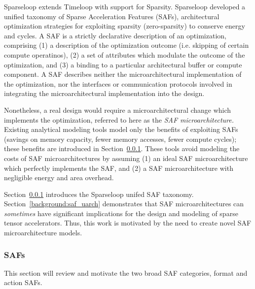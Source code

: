 Sparseloop\cite{sparseloop} extends Timeloop with support for Sparsity. Sparseloop developed a unified taxonomy of Sparse Acceleration Features (SAFs), architectural optimization strategies for exploiting sparsity (zero-sparsity) to conserve energy and cycles. A SAF is a strictly declarative description of an optimization, comprising (1) a description of the optimization outcome (i.e. skipping of certain compute operatinos), (2) a set of attributes which modulate the outcome of the optimization, and (3) a binding to a particular architectural buffer or compute component. A SAF describes neither the microarchitectural implementation of the optimization, nor the interfaces or communication protocols involved in integrating the microarchitectural implementation into the design. 

Nonetheless, a real design would require a microarchitectural change which implements the optimization, referred to here as the \textit{SAF microarchitecture.} Existing analytical modeling tools\cite{sparseloop} model only the benefits of exploiting SAFs (savings on memory capacity, fewer memory accesses, fewer compute cycles); these benefits are introduced in Section~\ref{background:safs}. These tools avoid modeling the costs of SAF microarchitectures by assuming (1) an ideal SAF microarchitecture which perfectly implements the SAF, and (2) a SAF microarchitecture with negligible energy and area overhead.

Section~\ref{background:safs} introduces the Sparseloop unifed SAF taxonomy. Section~\ref{background:saf_uarch} demonstrates that SAF microarchitectures can \textit{sometimes} have significant implications for the design and modeling of sparse tensor accelerators. Thus, this work is motivated by the need to create novel SAF microarchitecture models.

%
%
\subsubsection{SAFs}
\label{background:safs}

This section will review and motivate the two broad SAF categories, format and action SAFs.

